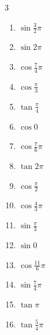 \begin{multicols}{3}
\begin{enumerate}
  \item $\displaystyle \sin{\frac{3}{2}\pi}$
        \phantom{$\displaystyle =-1$}

  \item $\displaystyle \sin{2\pi}$
        \phantom{$\displaystyle =0$}

  \item $\displaystyle \cos{\frac{7}{4}\pi}$

  \item $\displaystyle \cos{\frac{\pi}{3}}$

  \item $\displaystyle \tan{\frac{\pi}{4}}$
        \phantom{$\displaystyle =1$}

  \item $\displaystyle \cos{0}$
        \phantom{$\displaystyle =1$}

  \item $\displaystyle \cos{\frac{7}{6}\pi}$

  \item $\displaystyle \tan{2\pi}$
        \phantom{$\displaystyle =0$}

  \item $\displaystyle \cos{\frac{\pi}{2}}$
        \phantom{$\displaystyle =0$}

  \item $\displaystyle \cos{\frac{4}{3}\pi}$

  \item $\displaystyle \sin{\frac{\pi}{3}}$

  \item $\displaystyle \sin{0}$
        \phantom{$\displaystyle =0$}

  \item $\displaystyle \cos{\frac{11}{6}\pi}$

  \item $\displaystyle \sin{\frac{7}{4}\pi}$

  \item $\displaystyle \tan{\pi}$
        \phantom{$\displaystyle =0$}

  \item $\displaystyle \tan{\frac{5}{4}\pi}$
        \phantom{$\displaystyle =1$}


\end{enumerate}
\end{multicols}
